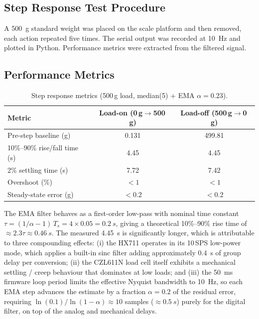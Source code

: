 \documentclass[12pt,a4paper]{article}
\begin{document}
\subsection{Step Response Test Procedure}

A \SI{500}{g} standard weight was placed on the scale platform and then removed, each
action repeated five times. The serial output was recorded at \SI{10}{Hz} and plotted
in Python. Performance metrics were extracted from the filtered signal.

\subsection{Performance Metrics}

\begin{table}[H]
\centering
\caption{Step response metrics (500\,g load, median(5) + EMA $\alpha = 0.23$).}
\label{tab:step}
\begin{tabular}{@{}lcc@{}}
\toprule
\textbf{Metric} & \textbf{Load-on (0\,g$\to$500\,g)} & \textbf{Load-off (500\,g$\to$0\,g)} \\
\midrule
Pre-step baseline (g)          & 0.131  & 499.81 \\
10\%--90\% rise/fall time (s)  & 4.45   & 4.45   \\
2\% settling time (s)          & 7.72   & 7.42   \\
Overshoot (\%)                 & $<1$   & $<1$   \\
Steady-state error (g)         & $<0.2$ & $<0.2$ \\
\bottomrule
\end{tabular}
\end{table}

The EMA filter behaves as a first-order low-pass with nominal time constant
$\tau = (1/\alpha - 1)\,T_s = 4 \times 0.05 = \SI{0.2}{s}$, giving a theoretical
10\%--90\% rise time of $\approx 2.3\tau \approx \SI{0.46}{s}$. The measured
\SI{4.45}{s} is significantly longer, which is attributable to three compounding effects:
(i) the HX711 operates in its 10\,SPS low-power mode, which applies a built-in sinc
filter adding approximately \SI{0.4}{s} of group delay per conversion;
(ii) the CZL611N load cell itself exhibits a mechanical settling / creep behaviour
that dominates at low loads; and
(iii) the \SI{50}{ms} firmware loop period limits the effective Nyquist bandwidth
to \SI{10}{Hz}, so each EMA step advances the estimate by a fraction $\alpha = 0.2$
of the residual error, requiring $\ln(0.1)/\ln(1-\alpha) \approx 10$ samples
($\approx \SI{0.5}{s}$) purely for the digital filter, on top of the analog and
mechanical delays.
\end{document}
